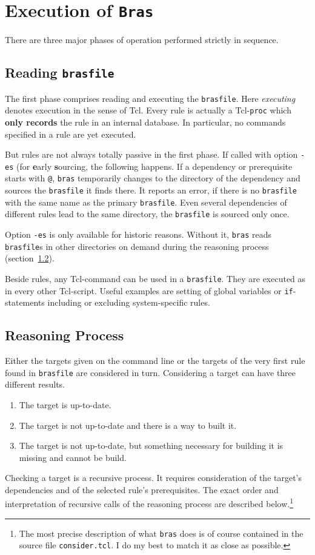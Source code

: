 \documentclass[12pt]{article}
\newcommand{\bras}{\texttt{bras}}
\newcommand{\Bras}{\texttt{Bras}}
\begin{document}
\section{Execution of \Bras}

There are three major phases of operation performed strictly in
sequence.

\subsection{Reading \texttt{brasfile}}
The first phase comprises reading and executing the
\texttt{brasfile}. Here \textit{executing} 
denotes execution in the sense of Tcl. Every rule is actually a
Tcl-\texttt{proc} which \textbf{only records} the rule in an internal
database. In particular, no commands specified in a rule are yet
executed. 

But rules are not always totally passive in the first phase. 
If called with option \texttt{-es} (for \textbf{e}arly
\textbf{s}ourcing, the following happens.
If a dependency or prerequisite starts with \texttt{@}, \bras{}
temporarily changes to the directory of the dependency and sources the
\texttt{brasfile} it finds there. It reports an error, if there is no
\texttt{brasfile} with the same name as the primary
\texttt{brasfile}. Even several dependencies of different rules lead
to the same directory, the \texttt{brasfile} is sourced only once.

Option \texttt{-es} is only available for historic reasons. Without
it, \bras{} reads \texttt{brasfile}s in other directories on demand
during the reasoning process (section~\ref{secReasoning}).

Beside rules, any Tcl-command can be used in a \texttt{brasfile}. They
are executed as in every other Tcl-script. Useful examples are setting
of global variables or \texttt{if}-statements including or excluding
system-specific rules.

\subsection{Reasoning Process}
\label{secReasoning}
Either the targets given on the command line or the targets of the
very first rule found in \texttt{brasfile} are considered in
turn. Considering a target can have three different results. 
\begin{enumerate}
\item
The target is up-to-date.
\item
The target is not up-to-date and there is a way to built it.
\item
The target is not up-to-date, but something necessary for building it
is missing and cannot be build.
\end{enumerate}
Checking a target is a recursive process. It requires consideration of
the target's dependencies and of the selected rule's
prerequisites. The exact order and interpretation of recursive calls
of the reasoning process are described below.\footnote{The most
precise description of what \bras{} does is of course contained in the
source file \texttt{consider.tcl}. I do my best to match it as close
as possible.}
\end{document}

